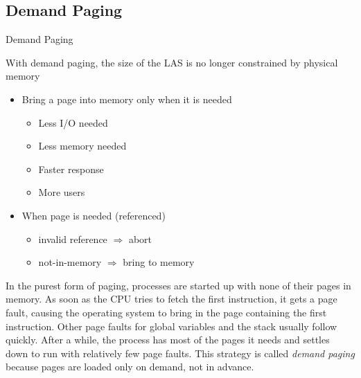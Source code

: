 \subsection{Demand Paging}

\begin{frame}{Demand Paging}
  \begin{iblock}{With demand paging, the size of the LAS is no longer constrained by
      physical memory}
    \begin{itemize}
    \item Bring a page into memory only when it is needed
      \begin{itemize}
      \item[\good] Less I/O needed
      \item[\good] Less memory needed
      \item[\good] Faster response
      \item[\good] More users
      \end{itemize}
    \item When page is needed (referenced)
      \begin{itemize}
      \item invalid reference $\Rightarrow$ abort
      \item not-in-memory $\Rightarrow$ bring to memory
      \end{itemize}
    \end{itemize}
  \end{iblock}
\end{frame}

In the purest form of paging, processes are started up with none of their pages in
memory. As soon as the CPU tries to fetch the first instruction, it gets a page fault,
causing the operating system to bring in the page containing the first instruction. Other
page faults for global variables and the stack usually follow quickly. After a while, the
process has most of the pages it needs and settles down to run with relatively few page
faults. This strategy is called \emph{demand paging} because pages are loaded only on
demand, not in advance.

